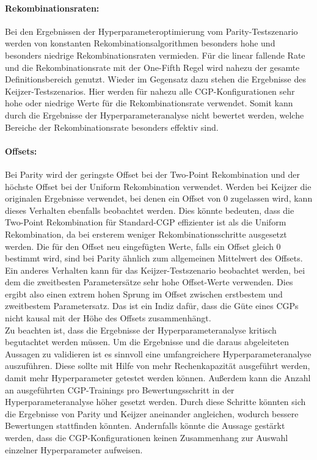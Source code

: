 \paragraph{Rekombinationsraten:} Bei den Ergebnissen der Hyperparameteroptimierung vom Pa\-ri\-ty-Test\-sze\-na\-rio werden von konstanten Rekombinationsalgorithmen besonders hohe und besonders niedrige Rekombinationsraten vermieden.
Für die linear fallende Rate und die Rekombinationsrate mit der One-Fifth Regel wird nahezu der gesamte Definitionsbereich genutzt.
Wieder im Gegensatz dazu stehen die Ergebnisse des Keijzer-Testszenarios.
Hier werden für nahezu alle CGP-Konfigurationen sehr hohe oder niedrige Werte für die Rekombinationsrate verwendet.
Somit kann durch die Ergebnisse der Hyperparameteranalyse nicht bewertet werden, welche Bereiche der Rekombinationsrate besonders effektiv sind.\\
\paragraph{Offsets:} Bei Parity wird der geringste Offset bei der Two-Point Rekombination und der höchste Offset bei der Uniform Rekombination verwendet.
Werden bei Keijzer die originalen Ergebnisse verwendet, bei denen ein Offset von 0 zugelassen wird, kann dieses Verhalten ebenfalls beobachtet werden.
Dies könnte bedeuten, dass die Two-Point Rekombination für Standard-CGP effizienter ist als die Uniform Rekombination, da bei ersterem weniger Rekombinationsschritte ausgesetzt werden.
Die für den Offset neu eingefügten Werte, falls ein Offset gleich 0 bestimmt wird, sind bei Parity ähnlich zum allgemeinen Mittelwert des Offsets.
Ein anderes Verhalten kann für das Keijzer-Testszenario beobachtet werden, bei dem die zweitbesten Parametersätze sehr hohe Offset-Werte verwenden.
Dies ergibt also einen extrem hohen Sprung im Offset zwischen erstbestem und zweitbestem Parametersatz.
Das ist ein Indiz dafür, dass die Güte eines CGPs nicht kausal mit der Höhe des Offsets zusammenhängt.\\
Zu beachten ist, dass die Ergebnisse der Hyperparameteranalyse kritisch begutachtet werden müssen.
Um die Ergebnisse und die daraus abgeleiteten Aussagen zu validieren ist es sinnvoll eine umfangreichere Hyperparameteranalyse auszuführen.
Diese sollte mit Hilfe von mehr Rechenkapazität ausgeführt werden, damit mehr Hyperparameter getestet werden können.
Außerdem kann die Anzahl an ausgeführten CGP-Trainings pro Bewertungsschritt in der Hyperparameteranalyse höher gesetzt werden.
Durch diese Schritte könnten sich die Ergebnisse von Parity und Keijzer aneinander angleichen, wodurch bessere Bewertungen stattfinden könnten.
Andernfalls könnte die Aussage gestärkt werden, dass die CGP-Konfigurationen keinen Zusammenhang zur Auswahl einzelner Hyperparameter aufweisen.

